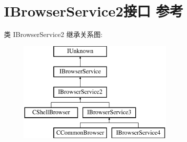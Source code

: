 \hypertarget{interface_i_browser_service2}{}\section{I\+Browser\+Service2接口 参考}
\label{interface_i_browser_service2}
类 I\+Browser\+Service2 继承关系图\+:\begin{figure}[H]
\begin{center}
\leavevmode
\includegraphics[height=5.000000cm]{interface_i_browser_service2}
\end{center}
\end{figure}
